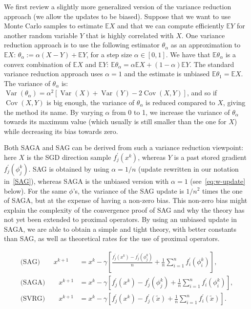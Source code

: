 \documentclass{article}
\newcommand{\stepsize}{\gamma} %
\def \E{{\mathbb E}} %
\DeclareMathOperator{\var}{Var} %
\DeclareMathOperator{\cov}{Cov} %
\begin{document}
We first review a slightly more generalized version of the variance reduction approach (we allow the updates to be biased). Suppose that we want to use Monte Carlo samples to estimate $\E X$ and that we can compute efficiently $\E Y$ for another random variable $Y$ that is highly correlated with $X$. One variance reduction approach is to use the following estimator $\theta_\alpha$ as an approximation to $\E X$: $\theta_\alpha := \alpha(X-Y) + \E Y$, for a step size $\alpha \in [0,1]$. We have that $\E \theta_\alpha$ is a convex combination of $\E X$ and $\E Y$: $\E \theta_\alpha = \alpha \E X + (1-\alpha) \E Y$. The standard variance reduction approach uses $\alpha=1$ and the estimate is unbiased $\E \theta_1 = \E X$. The variance of $\theta_\alpha$ is: $\var(\theta_\alpha) = \alpha^2 [\var(X) + \var(Y) - 2 \cov(X,Y)]$, and so if $\cov(X,Y)$ is big enough, the variance of $\theta_\alpha$ is reduced compared to $X$, giving the method its name. By varying $\alpha$ from 0 to 1, we increase the variance of $\theta_\alpha$ towards its maximum value (which usually is still smaller than the one for $X$) while decreasing its bias towards zero. 

Both SAGA and SAG can be derived from such a variance reduction viewpoint: here $X$ is the SGD direction sample $f_{j}^{\prime}(x^k)$, whereas $Y$ is a past stored gradient $f_{j}^{\prime}(\phi_j^k)$. SAG is obtained by using $\alpha=1/n$ (update rewritten in our notation in~\eqref{SAG}), whereas SAGA is the unbiased version with $\alpha=1$ (see~\eqref{eq:w-update} below). For the same $\phi$'s, the variance of the SAG update is $1/n^2$ times the one of SAGA, but at the expense of having a non-zero bias. This non-zero bias might explain the complexity of the convergence proof of SAG and why the theory has not yet been extended to proximal operators. By using an unbiased update in SAGA, we are able to obtain a simple and tight theory, with better constants than SAG, as well as theoretical rates for the use of proximal operators.

\vspace{-5mm}
\begin{align}
\textrm{(SAG)} \qquad x^{k+1} &=x^{k}-\stepsize  \left[ \frac{f_{j}^{\prime}(x^k)-f_{j}^{\prime}(\phi_{j}^{k})}{n}+\frac{1}{n}\sum^{n}_{i=1}f_{i}^{\prime}(\phi_{i}^{k})\right], \label{SAG} \\
\textrm{(SAGA)} \qquad x^{k+1} &=x^{k}-\stepsize  \left[ f_{j}^{\prime}(x^k)-f_{j}^{\prime}(\phi_{j}^{k})+\frac{1}{n}\sum^{n}_{i=1}f_{i}^{\prime}(\phi_{i}^{k})\right], \label{eq:w-update} \\
\textrm{(SVRG)} \qquad x^{k+1} &=x^{k}-\stepsize  \left[ f_{j}^{\prime}(x^{k})-f_{j}^{\prime}(\tilde{x})+\frac{1}{n}\sum^{n}_{i=1}f_{i}^{\prime}(\tilde{x})\right]. \label{eq-SVRG}
\end{align}
\end{document}
